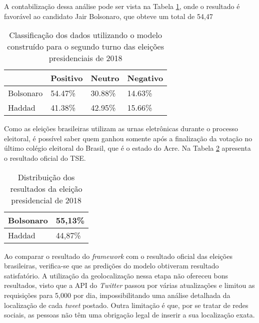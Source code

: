  A contabilização dessa análise pode ser vista na Tabela \ref{tb:bolso_haddad}, onde o resultado é favorável ao candidato Jair Bolsonaro, que obteve um total de 54,47%
 
 
 \begin{table}
     \label{tb:bolso_haddad}
     \centering
     \caption{Classificação dos dados utilizando o modelo construído para o segundo turno das eleições presidenciais de 2018}
    
     \begin{tabular}{llll}
     \hline
               & Positivo & Neutro & Negativo \\ \hline
     Bolsonaro  & 54.47\%  & 30.88\% & 14.63\%  \\ \hline
     Haddad     & 41.38\%  & 42.95\% & 15.66\%  \\ \hline
     \end{tabular}
 \end{table}
 
 
 Como as eleições brasileiras utilizam as urnas eletrônicas durante o processo eleitoral, é possível saber 
 quem ganhou somente após a finalização da votação no último colégio eleitoral do Brasil, que é o estado do Acre. Na Tabela
 \ref{tb:tse2018} apresenta o resultado oficial do \acrshort{TSE}.
 
 
 \begin{table}[tbp]
     \centering
     \caption{Distribuição dos resultados da eleição presidencial de 2018}
     \label{tb:tse2018}
     \begin{tabular}{ll}
     \hline
     Bolsonaro & 55,13\% \\ \hline
     Haddad & 44,87\% \\ \hline
     \end{tabular}
 \end{table}
 
 
 Ao comparar o resultado do \textit{framework} com o resultado oficial das eleições brasileiras, verifica-se que as predições do modelo obtiveram resultado satisfatório. A utilização da geolocalização nessa etapa não ofereceu bons resultados, visto que
 a \acrshort{API} do \textit{Twitter} passou por várias atualizações e limitou as requisições para 5,000 por dia, impossibilitando 
 uma análise detalhada da localização de cada \textit{tweet} postado. Outra limitação é que, por se tratar de redes sociais, as pessoas
 não têm uma obrigação legal de inserir a sua localização exata.